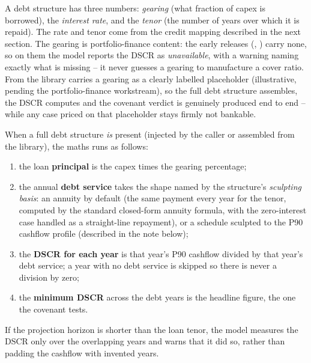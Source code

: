 A debt structure has three numbers: \emph{gearing} (what fraction of capex is borrowed), the \emph{interest rate}, and the \emph{tenor} (the number of years over which it is repaid). The rate and tenor come from the credit mapping described in the next section. The gearing is portfolio-finance content: the early releases (, ) carry none, so on them the model reports the DSCR as \emph{unavailable}, with a warning naming exactly what is missing -- it never guesses a gearing to manufacture a cover ratio. From  the library carries a gearing as a clearly labelled placeholder (illustrative, pending the portfolio-finance workstream), so the full debt structure assembles, the DSCR computes and the covenant verdict is genuinely produced end to end -- while any case priced on that placeholder stays firmly not bankable.

When a full debt structure \emph{is} present (injected by the caller or assembled from the library), the maths runs as follows:

\begin{enumerate}
  \item the loan \textbf{principal} is the capex times the gearing percentage;
  \item the annual \textbf{debt service} takes the shape named by the structure's \emph{sculpting basis}: an annuity by default (the same payment every year for the tenor, computed by the standard closed-form annuity formula, with the zero-interest case handled as a straight-line repayment), or a schedule sculpted to the P90 cashflow profile (described in the note below);
  \item the \textbf{DSCR for each year} is that year's P90 cashflow divided by that year's debt service; a year with no debt service is skipped so there is never a division by zero;
  \item the \textbf{minimum DSCR} across the debt years is the headline figure, the one the covenant tests.
\end{enumerate}

If the projection horizon is shorter than the loan tenor, the model measures the DSCR only over the overlapping years and warns that it did so, rather than padding the cashflow with invented years.

